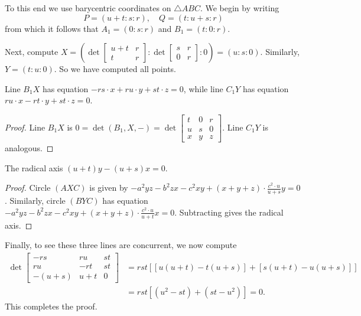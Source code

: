\documentclass[11pt]{scrartcl}
\begin{document}
To this end we use barycentric coordinates on $\triangle ABC$.
We begin by writing
\[ P = (u+t : s : r), \quad Q = (t : u+s : r) \]
from which it follows that
$A_1 = (0 : s : r)$ and $B_1 = (t : 0 : r)$.

Next, compute $X = \left(
  \det \left[ \begin{smallmatrix} u+t & r \\ t & r \end{smallmatrix} \right]
  : \det \left[ \begin{smallmatrix} s & r \\ 0 & r \end{smallmatrix} \right]
  : 0 \right) = (u : s : 0)$.
Similarly, $Y = (t : u : 0)$.
So we have computed all points.
\begin{claim*}
  Line $B_1X$ has equation
  $-rs \cdot x + ru \cdot y + st \cdot z = 0$,
  while line $C_1 Y$ has equation
  $ru \cdot x - rt \cdot y + st \cdot z = 0$.
\end{claim*}
\begin{proof}
  Line $B_1X$ is $0 = \det(B_1, X, -)
  = \det \left[ \begin{smallmatrix}
    t & 0 & r \\
    u & s & 0 \\
    x & y & z
\end{smallmatrix} \right]$.
  Line $C_1Y$ is analogous.
\end{proof}

\begin{claim*}
  The radical axis $(u+t) y - (u+s) x = 0$.
\end{claim*}
\begin{proof}
Circle $(AXC)$ is given by
$-a^2yz - b^2zx - c^2xy + (x+y+z) \cdot \frac{c^2 \cdot u}{u+s} y = 0$.
Similarly, circle $(BYC)$ has equation
$-a^2yz - b^2zx - c^2xy + (x+y+z) \cdot \frac{c^2 \cdot u}{u+t} x = 0$.
Subtracting gives the radical axis.
\end{proof}

Finally, to see these three lines are concurrent, we now compute
\begin{align*}
  \det \begin{bmatrix}
    -rs & ru & st \\
    ru & -rt & st \\
    -(u+s) & u+t & 0
  \end{bmatrix}
  &= rst \left[ [u(u+t)-t(u+s)] + [s(u+t)-u(u+s)] \right] \\
  &= rst \left[ (u^2-st) + (st-u^2) \right] = 0.
\end{align*}
This completes the proof.
\end{document}
